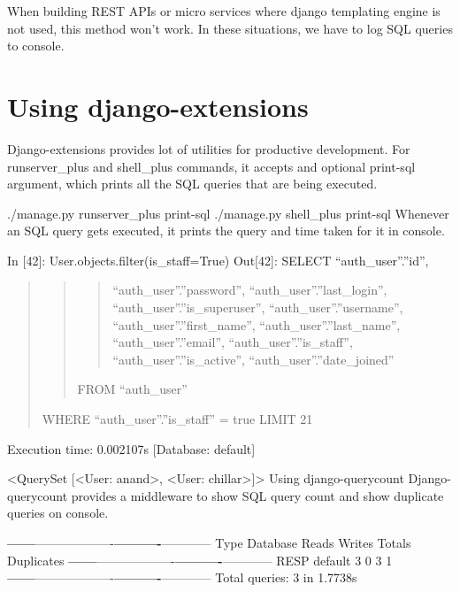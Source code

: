 \documentclass[letterpaper,11pt,english]{sphinxmanual}
\begin{document}
When building REST APIs or micro services where django templating engine is not used, this method won’t work. In these situations, we have to log SQL queries to console.


\section{Using django-extensions}
\label{\detokenize{orm_log_sql:using-django-extensions}}
Django-extensions provides lot of utilities for productive development. For runserver\_plus and shell\_plus commands, it accepts and optional \textendash{}print-sql argument, which prints all the SQL queries that are being executed.

./manage.py runserver\_plus \textendash{}print-sql
./manage.py shell\_plus \textendash{}print-sql
Whenever an SQL query gets executed, it prints the query and time taken for it in console.

In {[}42{]}: User.objects.filter(is\_staff=True)
Out{[}42{]}: SELECT “auth\_user”.”id”,
\begin{quote}
\begin{quote}
\begin{quote}

“auth\_user”.”password”,
“auth\_user”.”last\_login”,
“auth\_user”.”is\_superuser”,
“auth\_user”.”username”,
“auth\_user”.”first\_name”,
“auth\_user”.”last\_name”,
“auth\_user”.”email”,
“auth\_user”.”is\_staff”,
“auth\_user”.”is\_active”,
“auth\_user”.”date\_joined”
\end{quote}

FROM “auth\_user”
\end{quote}

WHERE “auth\_user”.”is\_staff” = true
LIMIT 21
\end{quote}

Execution time: 0.002107s {[}Database: default{]}

\textless{}QuerySet {[}\textless{}User: anand\textgreater{}, \textless{}User: chillar\textgreater{}{]}\textgreater{}
Using django-querycount
Django-querycount provides a middleware to show SQL query count and show duplicate queries on console.

{\color{red}\bfseries{}\textbar{}------\textbar{}}———\textendash{}{\color{red}\bfseries{}\textbar{}----------\textbar{}}———-{\color{red}\bfseries{}\textbar{}----------\textbar{}}————\textbar{}
\textbar{} Type \textbar{} Database  \textbar{}   Reads  \textbar{}  Writes  \textbar{}  Totals  \textbar{} Duplicates \textbar{}
{\color{red}\bfseries{}\textbar{}------\textbar{}}———\textendash{}{\color{red}\bfseries{}\textbar{}----------\textbar{}}———-{\color{red}\bfseries{}\textbar{}----------\textbar{}}————\textbar{}
\textbar{} RESP \textbar{}  default  \textbar{}    3     \textbar{}    0     \textbar{}    3     \textbar{}     1      \textbar{}
{\color{red}\bfseries{}\textbar{}------\textbar{}}———\textendash{}{\color{red}\bfseries{}\textbar{}----------\textbar{}}———-{\color{red}\bfseries{}\textbar{}----------\textbar{}}————\textbar{}
Total queries: 3 in 1.7738s
\end{document}
